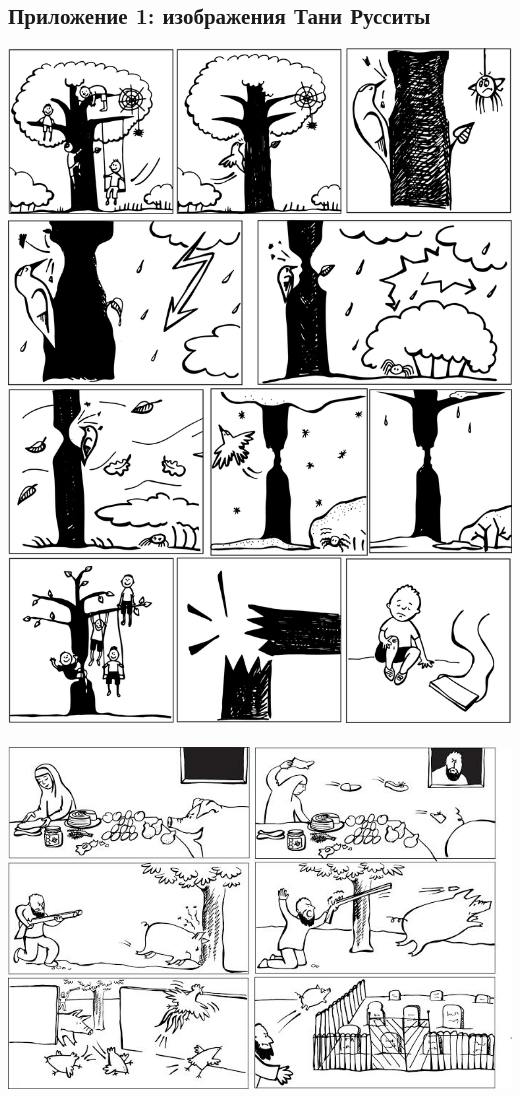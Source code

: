 \subsection{Приложение 1: изображения Тани Русситы} \label{pictures}
\noindent \includegraphics[width=\linewidth]{pauk.jpg}\\
\pagebreak\\
\includegraphics[width=\linewidth]{svinja.jpg}\\
\pagebreak
